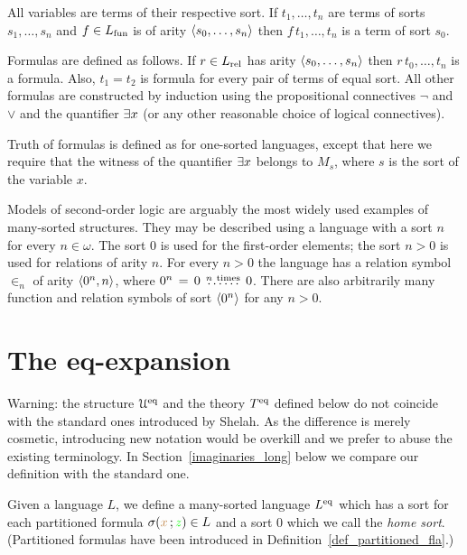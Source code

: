 \documentclass[creche.tex]{subfiles}
\begin{document}
All variables are terms of their respective sort.
If $t_1,\dots,t_n$ are terms of sorts $s_1,\dots,s_n$ and $f\in L_{\rm fun}$ is of arity $\langle s_0,\dots,s_n\rangle$ then $f\,t_1,\dots,t_n$ is a term of sort $s_0$.


Formulas are defined as follows.
If $r\in L_{\rm rel}$ has arity $\langle s_0,\dots,s_n\rangle$ then $r\,t_0,\dots,t_n$ is a formula.
Also, $t_1=t_2$ is formula for every pair of terms of equal sort.
All other formulas are constructed by induction using the propositional connectives $\neg$ and $\vee$ and the quantifier $\exists x$ (or any other reasonable choice of logical connectives).

Truth of formulas is defined as for one-sorted languages, except that here we require that the witness of the quantifier $\exists x$ belongs to $M_s$, where $s$ is the sort of the variable $x$.

Models of second-order logic are arguably the most widely used examples of many-sorted structures.
They may be described using a language with a sort $n$ for every $n\in\omega$.
The sort $0$ is used for the first-order elements; the sort $n>0$ is used for relations of arity $n$.
For every $n>0$ the language has a relation symbol $\in_n$ of arity $\langle0^n,n\rangle$, where $0^n\,=\, 0\,\stackrel{n\ \rm times}{\dots\dots}\,0$.
%
%
There are also arbitrarily many function and relation symbols of sort $\langle0^n\rangle$ for any $n>0$.

\section{The eq-expansion}\label{immaginari}

\noindent\llap{\textcolor{red}{\Large\danger}\kern1.5ex}Warning: the structure $\EuScript U^{{\rm eq}}$ and the theory $T^{{\rm eq}}$ defined below do not coincide with the standard ones introduced by Shelah.
As the difference is merely cosmetic, introducing new notation would be overkill and we prefer to abuse the existing terminology.
In Section~\ref{imaginaries_long} below we compare our definition with the standard one.

Given a language $L$, we define a many-sorted language \emph{$L^{{{\rm eq}}}$\/} which has a sort for each partitioned formula $\sigma({\color{brown} x}\,;{\color{green} z})\in L$ and a sort \emph{$0$\/} which we call the \emph{home sort}.
(Partitioned formulas have been introduced in Definition~\ref{def_partitioned_fla}.) 
\end{document}
